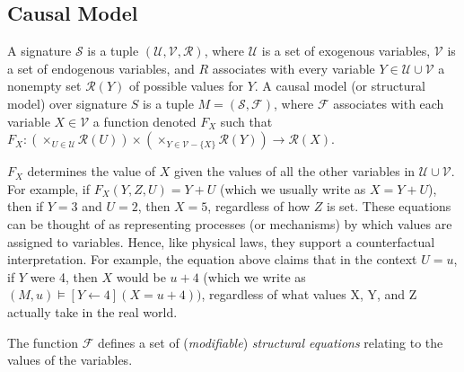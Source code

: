 \documentclass{article}
\begin{document}
\subsection{Causal Model}

A signature $\mathcal{S}$ is a tuple $(\mathcal{U},\mathcal{V},\mathcal{R})$,
where $\mathcal{U}$ is a set of exogenous variables, $\mathcal{V}$
is a set of endogenous variables, and $R$ associates with every variable
$Y\in \mathcal{U}\cup \mathcal{V}$ a nonempty set $\mathcal{R}(Y)$ of possible values for $Y$.
A causal model (or structural model) over signature $S$ is a tuple 
$M=(\mathcal{S},\mathcal{F})$, where $\mathcal{F}$ associates with 
each variable $X \in \mathcal{V}$ a function denoted $F_X$ such that
$F_X: (\times_{U\in \mathcal{U}}\mathcal{R}(U))\times (\times_{Y\in\mathcal{V}-\{X\}}\mathcal{R}(Y))\rightarrow \mathcal{R}(X)$.

$F_X$ determines the value of $X$ given the values of all the other variables 
in $\mathcal{U}\cup \mathcal{V}$.
For example, if $F_X(Y,Z,U)=Y+U$ (which we usually write as $X = Y + U$), 
then if $Y=3$ and $U=2$, then $X = 5$, regardless of how $Z$ is set.
These equations can be thought of as representing processes (or mechanisms) by which values are assigned to variables. Hence, like physical laws, they support a counterfactual interpretation.
For example, the equation above claims that in the context $U=u$, if $Y$ were 4, then $X$ would be $u+4$ (which we write as $(M,u) \models [Y\leftarrow 4](X = u + 4))$, regardless of what values X, Y, and Z actually take in the real world.


The function $\mathcal{F}$ defines a set of (\textit{modifiable}) \textit{structural equations} relating to the values of the variables.
\end{document}
